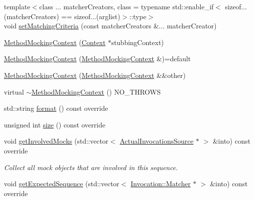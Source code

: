 \begin{DoxyCompactItemize}
\item 
{\footnotesize template$<$class ... matcher\+Creators, class  = typename std\+::enable\+\_\+if$<$                sizeof...(matcher\+Creators) == sizeof...(arglist)$>$\+::type$>$ }\\void \mbox{\hyperlink{classfakeit_1_1MethodMockingContext_ab6bf85e9f9f5e5eeb2766ec487a42e20}{set\+Matching\+Criteria}} (const matcher\+Creators \&... matcher\+Creator)
\item 
\mbox{\hyperlink{classfakeit_1_1MethodMockingContext_aa5d0708f0a044fbc8080f64091f8aa71}{Method\+Mocking\+Context}} (\mbox{\hyperlink{structfakeit_1_1MethodMockingContext_1_1Context}{Context}} $\ast$stubbing\+Context)
\item 
\mbox{\hyperlink{classfakeit_1_1MethodMockingContext_aff21ad1769db1e3f81decc54c4b43ed3}{Method\+Mocking\+Context}} (\mbox{\hyperlink{classfakeit_1_1MethodMockingContext}{Method\+Mocking\+Context}} \&)=default
\item 
\mbox{\hyperlink{classfakeit_1_1MethodMockingContext_af4dcf1f0a24f7cedd1d4c5ee23d1a313}{Method\+Mocking\+Context}} (\mbox{\hyperlink{classfakeit_1_1MethodMockingContext}{Method\+Mocking\+Context}} \&\&other)
\item 
virtual \mbox{\hyperlink{classfakeit_1_1MethodMockingContext_a92068a8b1affe1c7be6eafc12297c8c2}{$\sim$\+Method\+Mocking\+Context}} () N\+O\+\_\+\+T\+H\+R\+O\+WS
\item 
std\+::string \mbox{\hyperlink{classfakeit_1_1MethodMockingContext_a0e71b77ab7f91d629a5853542d48624a}{format}} () const override
\item 
unsigned int \mbox{\hyperlink{classfakeit_1_1MethodMockingContext_a47e66f1a704bad7681f70a3e612d08a6}{size}} () const override
\item 
void \mbox{\hyperlink{classfakeit_1_1MethodMockingContext_ac66ba7b51a3c845b8fe8f2fa0f5f5ff0}{get\+Involved\+Mocks}} (std\+::vector$<$ \mbox{\hyperlink{structfakeit_1_1ActualInvocationsSource}{Actual\+Invocations\+Source}} $\ast$ $>$ \&into) const override
\begin{DoxyCompactList}\small\item\em Collect all mock objects that are involved in this sequence. \end{DoxyCompactList}\item 
void \mbox{\hyperlink{classfakeit_1_1MethodMockingContext_ab88d912b17801968fab8443079e2eabc}{get\+Expected\+Sequence}} (std\+::vector$<$ \mbox{\hyperlink{structfakeit_1_1Invocation_1_1Matcher}{Invocation\+::\+Matcher}} $\ast$ $>$ \&into) const override

\end{DoxyCompactItemize}
